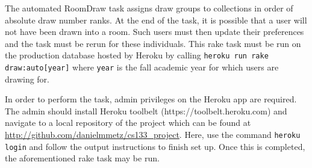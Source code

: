 The automated RoomDraw task assigns draw groups to collections in order of absolute draw number ranks. At the end of the task, it is possible that a user will not have been drawn into a room. Such users must then update their preferences and the task must be rerun for these individuals. This rake task must be run on the production database hosted by Heroku by calling \texttt{heroku run rake draw:auto[year]} where \texttt{year} is the fall academic year for which users are drawing for.

In order to perform the task, admin privileges on the Heroku app are required. The admin should install Heroku toolbelt (https://toolbelt.heroku.com) and navigate to a local repository of the project which can be found at \url{http://github.com/danielmmetz/cs133_project}. Here, use the command \texttt{heroku login} and follow the output instructions to finish set up. Once this is completed, the aforementioned rake task may be run.